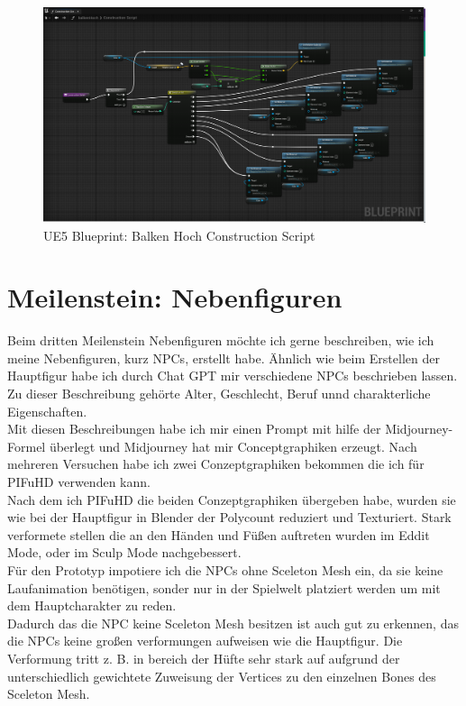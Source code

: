 {\begin{figure}[h]
	\includegraphics[width=14cm]{BilderFuerBA/Screenshot/UE5/balkenHochBP.png}
	\caption{UE5 Blueprint: Balken Hoch Construction Script}
	\label{UE5balkenHochBP}
\end{figure}

\section {Meilenstein: Nebenfiguren}
Beim dritten Meilenstein Nebenfiguren möchte ich gerne beschreiben, wie ich meine Nebenfiguren, kurz NPCs, erstellt habe. Ähnlich wie beim Erstellen der Hauptfigur habe ich durch Chat GPT mir verschiedene NPCs beschrieben lassen. Zu dieser Beschreibung gehörte Alter, Geschlecht, Beruf unnd charakterliche Eigenschaften.
\\
Mit diesen Beschreibungen habe ich mir einen Prompt mit hilfe der Midjourney-Formel überlegt und Midjourney hat mir Conceptgraphiken erzeugt. Nach mehreren Versuchen habe ich zwei Conzeptgraphiken bekommen die ich für PIFuHD verwenden kann.
\\
Nach dem ich PIFuHD die beiden Conzeptgraphiken übergeben habe, wurden sie wie bei der Hauptfigur in Blender der Polycount reduziert und Texturiert.  Stark verformete stellen die an den Händen und Füßen auftreten wurden im Eddit Mode, oder im Sculp Mode nachgebessert.
\\
Für den Prototyp impotiere ich die NPCs ohne Sceleton Mesh ein, da sie keine Laufanimation benötigen, sonder nur in der Spielwelt platziert werden um mit dem Hauptcharakter zu reden.
\\
Dadurch das die NPC keine Sceleton Mesh besitzen ist auch gut zu erkennen, das die NPCs keine großen verformungen aufweisen wie die Hauptfigur. Die Verformung tritt z. B. in bereich der Hüfte sehr stark auf aufgrund der unterschiedlich gewichtete Zuweisung der Vertices zu den einzelnen Bones des Sceleton Mesh.


}
